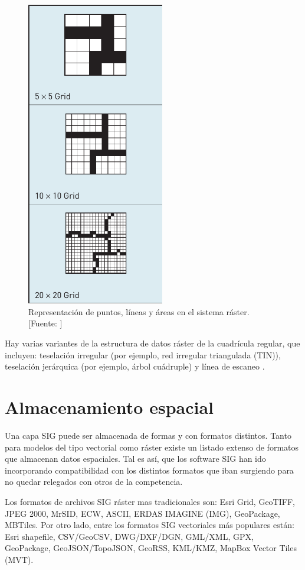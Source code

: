 \begin{figure}[H]
    \centering
    \includegraphics[width=6cm]{RasterResolution.png}
    \caption{Representación de puntos, líneas y áreas en el sistema ráster. [Fuente: ]}
    \label{fig:rasterResolution}
\end{figure}

Hay varias variantes de la estructura de datos ráster de la cuadrícula regular, que incluyen: teselación irregular (por ejemplo, red irregular triangulada (TIN)), teselación jerárquica (por ejemplo, árbol cuádruple) y línea de escaneo \citep{Peuquet1991MethodsEnvironment}.

\section{Almacenamiento espacial}

Una capa SIG puede ser almacenada de formas y con formatos distintos. Tanto para modelos del tipo vectorial como ráster existe un listado extenso de formatos que almacenan datos espaciales. Tal es así, que los software SIG han ido incorporando compatibilidad con los distintos formatos que iban surgiendo para no quedar relegados con otros de la competencia.

Los formatos de archivos SIG ráster mas tradicionales son: Esri Grid, GeoTIFF, JPEG 2000, MrSID, ECW, ASCII, ERDAS IMAGINE (IMG), GeoPackage, MBTiles. Por otro lado, entre los formatos SIG vectoriales más populares están: Esri shapefile, CSV/GeoCSV, DWG/DXF/DGN, GML/XML, GPX, GeoPackage, GeoJSON/TopoJSON, GeoRSS, KML/KMZ, MapBox Vector Tiles (MVT).

